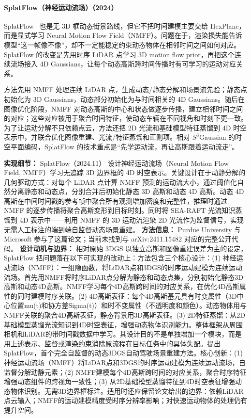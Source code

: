 \paragraph{SplatFlow（神经运动流场）（2024）}
SplatFlow~\cite{2411_15482} 也是无 3D 框动态街景路线，但它不把时间建模主要交给 HexPlane，而是显式学习 Neural Motion Flow Field（NMFF）。问题在于，渲染损失能告诉模型“这一帧像不像”，却不一定能稳定约束动态物体在相邻时间之间如何对应。SplatFlow 的改变是先用时序 LiDAR 点学习 3D motion flow prior，再把这个连续流场接入 4D Gaussians，让每个动态高斯跨时间传播时有可学习的运动对应关系。

方法先用 NMFF 处理连续 LiDAR 点，生成动态/静态分解和场景流先验；静态点初始化为 3D Gaussians，动态部分初始化为与时间相关的 4D Gaussians。随后在图像优化阶段，NMFF 对动态高斯的中心和状态做逐步传播，建立相邻时间之间的对应；这些对应被用于聚合时间特征，使动态车辆在不同视角和时刻下更一致。为了让运动分解不只依赖点云，方法还把 2D 光流和基础模型特征蒸馏到 4D 时空表示中，并联合优化图像重建、光流/特征蒸馏和正则项。相对 $S^3$Gaussian 的时空平面编码，SplatFlow 的技术重点是“先学运动流，再让高斯跟着运动流走”。

\textbf{实现细节：} SplatFlow（2024.11） 设计神经运动流场（Neural Motion Flow Field, NMFF）学习无追踪 3D 边界框的 4D 时空表示。关键设计在于动静分解的几何驱动方式：对每个 LiDAR 点计算 NMFF 预测的运动流大小，通过阈值化自然分离静态和动态点，分别合并后初始化静态 3D 高斯和动态 4D 高斯。动态 4D 高斯在中间时间戳的参考帧中聚合所有观测增加密度和完整性，推理时通过 NMFF 的逐步传播将聚合高斯变形到目标时刻。同时将 SEA-RAFT 光流知识蒸馏到 4D 表示中——利用 NMFF 的 3D 运动流渲染 2D 光流作为监督信号，实现无需人工标注的端到端自监督动态场景重建。
\textbf{方法信息：} Purdue University 与 Microsoft 参与了这篇论文；当前未找到与 arXiv:2411.15482 对应的完整公开代码。
\textbf{设计动机与边界：} 相对原始 3DGS 以独立高斯和图像重建误差为主的设定，SplatFlow 把问题落在以下可实现的改动上：方法包含三个核心设计：(1) 神经运动流场（NMFF）：一组隐函数，将LiDAR点和3DGS的时序运动建模为连续运动流场。首先用NMFF将时序LiDAR点分解为静态和动态点集，分别初始化静态3D高斯和动态4D高斯。NMFF学习每个4D高斯跨时间的对应关系，在优化4D高斯属性的同时建模时序关联。(2) 4D高斯表征：每个4D高斯基元具有时变属性（3D中心位置mu(t)和协方差Sigma(t)）和时不变属性（不透明度和颜色）。动态物体用与NMFF关联的聚合4D高斯表征，静态背景用3D高斯表征。(3) 2D特征蒸馏：从2D基础模型蒸馏光流知识到4D时空表征，增强动态物体识别能力。整体框架从周围相机和LiDAR的带时间戳数据中学习。其设计目的不是单独增加一个模块，而是用上述表示、监督或渲染约束消除原流程在目标任务中的具体失配。提出SplatFlow，首个完全自监督的动态3DGS自动驾驶场景重建方法。核心创新：(1) 神经运动流场（NMFF）将LiDAR点和3DGS的时序运动建模为连续运动流场，自监督分解动静元素；(2) NMFF建模每个4D高斯跨时间的对应关系，聚合时序特征增强动态组件的跨视角一致性；(3) 从2D基础模型蒸馏特征到4D时空表征增强动态物体识别。无需3D边界框标注。适用时还应保留论文给出的边界：依赖LiDAR点云输入；NMFF的运动建模精度受时序分辨率影响；对快速运动物体的处理仍有提升空间。
